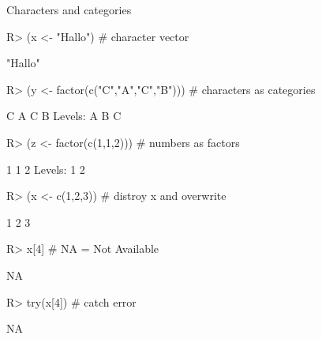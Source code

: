 \documentclass[10pt]{beamer}
\begin{document}
\begin{frame}[fragile]{Characters and categories}
\begin{Schunk}
\begin{Sinput}
R> (x <- "Hallo")                     # character vector
\end{Sinput}
\begin{Soutput}
[1] "Hallo"
\end{Soutput}
\begin{Sinput}
R> (y <- factor(c("C","A","C","B")))  # characters as categories
\end{Sinput}
\begin{Soutput}
[1] C A C B
Levels: A B C
\end{Soutput}
\begin{Sinput}
R> (z <- factor(c(1,1,2)))            # numbers as factors
\end{Sinput}
\begin{Soutput}
[1] 1 1 2
Levels: 1 2
\end{Soutput}
\begin{Sinput}
R> (x <- c(1,2,3))                    # distroy x and overwrite
\end{Sinput}
\begin{Soutput}
[1] 1 2 3
\end{Soutput}
\begin{Sinput}
R> x[4]                               # NA = Not Available
\end{Sinput}
\begin{Soutput}
[1] NA
\end{Soutput}
\begin{Sinput}
R> try(x[4])                          # catch error
\end{Sinput}
\begin{Soutput}
[1] NA
\end{Soutput}
\end{Schunk}
\end{frame}
%
\end{document}
